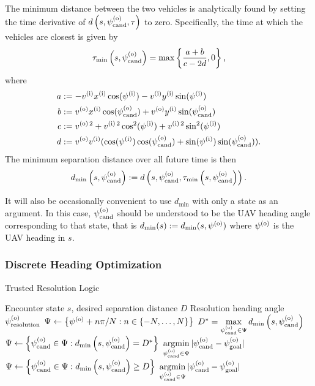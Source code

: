 The minimum distance between the two vehicles is analytically found by setting the time derivative of $d\left(s,\psi^{(\mathrm{o})}_{\mathrm{cand}}, \tau\right)$ to zero. Specifically, the time at which the vehicles are closest is given by
\begin{equation}
    \tau_\text{min}\left(s,\psi^{(\mathrm{o})}_{\mathrm{cand}}\right) = \max \left\{\frac{a + b}{c-2d}, 0\right\} \text{,}
\end{equation}
where
\begin{align*}
    a &:= -v^{(\mathrm{i})}x^{(\mathrm{i})} \cos(\psi^{(\mathrm{i})}) - v^{(\mathrm{i})} y^{(\mathrm{i})} \sin(\psi^{(\mathrm{i})}) \\
    b &:= v^{(\mathrm{o})} x^{(\mathrm{i})} \cos(\psi^{(\mathrm{o})}_{\mathrm{cand}}) + v^{(\mathrm{o})} y^{(\mathrm{i})} \sin(\psi^{(\mathrm{o})}_{\mathrm{cand}}) \\
    c &:= v^{(\mathrm{o})\,2} + v^{(\mathrm{i})\,2}\cos^2(\psi^{(\mathrm{i})}) + v^{(\mathrm{i})\,2}\sin^2(\psi^{(\mathrm{i})}) \\
    d &:= v^{(\mathrm{o})}v^{(\mathrm{i})} ( \cos(\psi^{(\mathrm{i})})\cos(\psi^{(\mathrm{o})}_{\mathrm{cand}}) + \sin(\psi^{(\mathrm{i})})\sin(\psi^{(\mathrm{o})}_{\mathrm{cand}}) ) \text{.}
\end{align*}
The minimum separation distance over all future time is then
\begin{equation}
    d_\text{min}\left(s, \psi^{(\mathrm{o})}_{\mathrm{cand}}\right) := d\left(s, \psi^{(\mathrm{o})}_{\mathrm{cand}}, \tau_\text{min}\left(s,\psi^{(\mathrm{o})}_{\mathrm{cand}}\right)\right) \text{.}
\end{equation}

It will also be occasionally convenient to use $d_\text{min}$ with only a state as an argument.
In this case, $\psi^{(\mathrm{o})}_{\mathrm{cand}}$ should be understood to be the UAV heading angle corresponding to that state, that is $d_\text{min}(s) := d_\text{min}(s, \psi^{(\mathrm{o})})$ where $\psi^{(\mathrm{o})}$ is the UAV heading in $s$.

\subsubsection{Discrete Heading Optimization}

\renewcommand{\algorithmicrequire}{\textbf{Input:}}
\renewcommand{\algorithmicensure}{\textbf{Output:}}
\begin{algorithm}[tbhp]
    \caption{Trusted Resolution Logic}\label{alg:trl}
\begin{algorithmic}
    \Require Encounter state $s$, desired separation distance $D$
    \Ensure Resolution heading angle $\psi^{(\mathrm{o})}_\mathrm{resolution}$
        \State $\Psi \gets \left\{\psi^{(\mathrm{o})} + n\pi/N : n \in \{-N,\ldots,N\} \right\}$
        \State $D^* = \underset{\psi^{(\mathrm{o})}_{\mathrm{cand}} \in \Psi}{\max}\, d_\text{min}\left(s, \psi^{(\mathrm{o})}_{\mathrm{cand}}\right)$
         
            \State $\Psi \gets \left\{\psi^{(\mathrm{o})}_{\mathrm{cand}} \in \Psi : d_\text{min}\left(s, \psi^{(\mathrm{o})}_{\mathrm{cand}}\right) = D^*\right\}$
            \State \Return $\underset{\psicand \in \Psi}{\argmin}\,|\psicand-\psigoal|$
        \Else
            \State $\Psi \gets \left\{\psi^{(\mathrm{o})}_{\mathrm{cand}} \in \Psi : d_\text{min}\left(s, \psi^{(\mathrm{o})}_{\mathrm{cand}}\right) \geq D\right\}$
            \State \Return $\underset{\psicand \in \Psi}{\argmin}\,|\psicand-\psigoal|$
        \EndIf
    \EndFunction
\end{algorithmic}
\end{algorithm}

